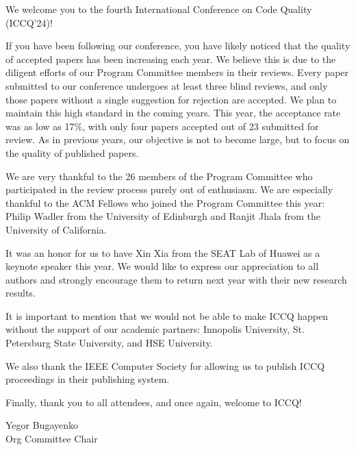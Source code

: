 \cleardoublepage
{}

We welcome you to the fourth International Conference on Code Quality (ICCQ'24)!

If you have been following our conference, you have likely noticed that the quality of accepted papers has been increasing each year. We believe this is due to the diligent efforts of our Program Committee members in their reviews. Every paper submitted to our conference undergoes at least three blind reviews, and only those papers without a single suggestion for rejection are accepted. We plan to maintain this high standard in the coming years. This year, the acceptance rate was as low as 17\%, with only four papers accepted out of 23 submitted for review. As in previous years, our objective is not to become large, but to focus on the quality of published papers.

We are very thankful to the 26 members of the Program Committee who participated in the review process purely out of enthusiasm. We are especially thankful to the ACM Fellows who joined the Program Committee this year: Philip Wadler from the University of Edinburgh and Ranjit Jhala from the University of California.

It was an honor for us to have Xin Xia from the SEAT Lab of Huawei as a keynote speaker this year. We would like to express our appreciation to all authors and strongly encourage them to return next year with their new research results.

It is important to mention that we would not be able to make ICCQ happen without the support of our academic partners: Innopolis University, St. Petersburg State University, and HSE University.

We also thank the IEEE Computer Society for allowing us to publish ICCQ proceedings in their publishing system.

Finally, thank you to all attendees, and once again, welcome to ICCQ!

\vspace{18pt}
Yegor Bugayenko\\
Org Committee Chair
